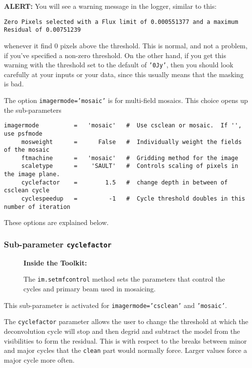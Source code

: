 {\bf ALERT:} You will see a warning message in the logger, 
similar to this:
\small
\begin{verbatim}
Zero Pixels selected with a Flux limit of 0.000551377 and a maximum Residual of 0.00751239
\end{verbatim}
\normalsize
whenever it find 0 pixels above the threshold.  This is normal,
and not a problem, if you've specified a non-zero threshold.
On the other hand, if you get this warning with the threshold set to
the default of {\tt '0Jy'}, then you should look carefully at your
inputs or your data, since this usually means that the masking is bad.

The option {\tt imagermode='mosaic'} is for multi-field mosaics.  This
choice opens up the sub-parameters 
\small
\begin{verbatim}
imagermode          =   'mosaic'   #  Use csclean or mosaic.  If '', use psfmode
     mosweight      =      False   #  Individually weight the fields of the mosaic
     ftmachine      =   'mosaic'   #  Gridding method for the image
     scaletype      =    'SAULT'   #  Controls scaling of pixels in the image plane.
     cyclefactor    =        1.5   #  change depth in between of  csclean cycle
     cyclespeedup   =         -1   #  Cycle threshold doubles in this number of iteration
\end{verbatim}
\normalsize
These options are explained below.  

\subsubsection{Sub-parameter {\tt cyclefactor} }
\label{section:im.clean.imagermode.cyclefactor}

\begin{wrapfigure}{r}{2.5in}
  \begin{boxedminipage}{2.5in}
     \centerline{\bf Inside the Toolkit:}
     The {\tt im.setmfcontrol} method sets the parameters that control
     the cycles and primary beam used in mosaicing.
  \end{boxedminipage}
\end{wrapfigure}

This sub-parameter is activated for {\tt imagermode='csclean'} and
{\tt 'mosaic'}.

The {\tt cyclefactor} parameter allows the user to change the
threshold at which the deconvolution cycle will stop and then degrid and
subtract the model from the visibilities to form the residual. This is
with respect to the breaks between minor and major cycles that the
{\tt clean} part would normally force.  Larger values force a major
cycle more often.  

